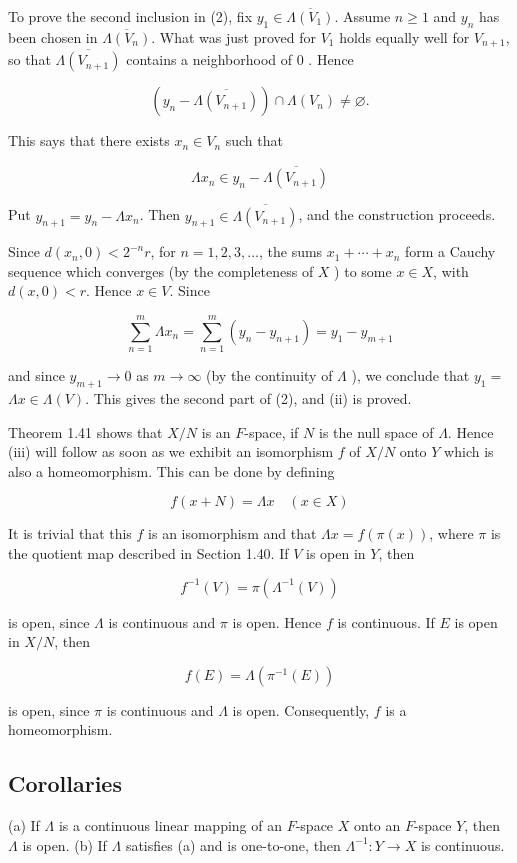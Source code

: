 \documentclass[10pt]{article}
\begin{document}
To prove the second inclusion in (2), fix $y_{1} \in \overline{\Lambda\left(V_{1}\right)}$. Assume $n \geq 1$ and $y_{n}$ has been chosen in $\overline{\Lambda\left(V_{n}\right)}$. What was just proved for $V_{1}$ holds equally well for $V_{n+1}$, so that $\overline{\Lambda\left(V_{n+1}\right)}$ contains a neighborhood of 0 . Hence

$$
\left(y_{n}-\overline{\Lambda\left(V_{n+1}\right)}\right) \cap \Lambda\left(V_{n}\right) \neq \varnothing .
$$

This says that there exists $x_{n} \in V_{n}$ such that

$$
\Lambda x_{n} \in y_{n}-\overline{\Lambda\left(V_{n+1}\right)}
$$

Put $y_{n+1}=y_{n}-\Lambda x_{n}$. Then $y_{n+1} \in \overline{\Lambda\left(V_{n+1}\right)}$, and the construction proceeds.

Since $d\left(x_{n}, 0\right)<2^{-n} r$, for $n=1,2,3, \ldots$, the sums $x_{1}+\cdots+x_{n}$ form a Cauchy sequence which converges (by the completeness of $X$ ) to some $x \in X$, with $d(x, 0)<r$. Hence $x \in V$. Since

$$
\sum_{n=1}^{m} \Lambda x_{n}=\sum_{n=1}^{m}\left(y_{n}-y_{n+1}\right)=y_{1}-y_{m+1}
$$

and since $y_{m+1} \rightarrow 0$ as $m \rightarrow \infty$ (by the continuity of $\Lambda$ ), we conclude that $y_{1}=$ $\Lambda x \in \Lambda(V)$. This gives the second part of (2), and (ii) is proved.

Theorem 1.41 shows that $X / N$ is an $F$-space, if $N$ is the null space of $\Lambda$. Hence (iii) will follow as soon as we exhibit an isomorphism $f$ of $X / N$ onto $Y$ which is also a homeomorphism. This can be done by defining

$$
f(x+N)=\Lambda x \quad(x \in X)
$$

It is trivial that this $f$ is an isomorphism and that $\Lambda x=f(\pi(x))$, where $\pi$ is the quotient map described in Section 1.40. If $V$ is open in $Y$, then

$$
f^{-1}(V)=\pi\left(\Lambda^{-1}(V)\right)
$$

is open, since $\Lambda$ is continuous and $\pi$ is open. Hence $f$ is continuous. If $E$ is open in $X / N$, then

$$
f(E)=\Lambda\left(\pi^{-1}(E)\right)
$$

is open, since $\pi$ is continuous and $\Lambda$ is open. Consequently, $f$ is a homeomorphism.

\subsection{Corollaries}
(a) If $\Lambda$ is a continuous linear mapping of an $F$-space $X$ onto an $F$-space $Y$, then $\Lambda$ is open.
(b) If $\Lambda$ satisfies (a) and is one-to-one, then $\Lambda^{-1}: Y \rightarrow X$ is continuous.
\end{document}
